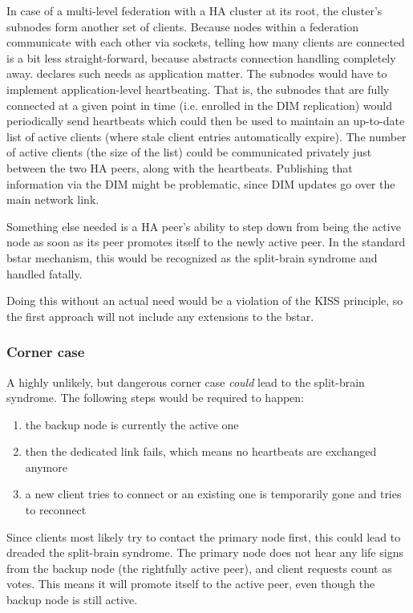 In case of a multi-level federation with a HA cluster at its root, the
cluster's subnodes form another set of clients. Because nodes within a
federation communicate with each other via \zmq sockets, telling how many
clients are connected is a bit less straight-forward, because \zmq abstracts
connection handling completely away. \zmq declares such needs as application matter.
The subnodes would have to implement application-level heartbeating.
That is, the subnodes that are fully connected at a given point in time (i.e. enrolled
in the DIM replication) would periodically send heartbeats which could then be
used to maintain an up-to-date list of active clients (where stale client
entries automatically expire).  The number of active clients (the size of the
list) could be communicated privately just between the two HA peers, along with
the heartbeats. Publishing that information via the DIM might be problematic,
since DIM updates go over the main network link.

Something else needed is a HA peer's ability to step down from being the
active node as soon as its peer promotes itself to the newly active peer. In
the standard \gls{bstar} mechanism, this would be recognized as the split-brain
syndrome and handled fatally.

Doing this without an actual need would be a violation of the KISS principle,
so the first approach will not include any extensions to the \gls{bstar}.

\subsubsection{Corner case}
A highly unlikely, but dangerous corner case \emph{could} lead to the
split-brain syndrome. The following steps would be required to happen:

\begin{enumerate}
	\item the backup node is currently the active one

	\item then the dedicated link fails, which means no heartbeats are
		exchanged anymore

	\item a new client tries to connect or an existing one is temporarily
		gone and tries to reconnect
\end{enumerate}

Since clients most likely try to contact the primary node first, this could
lead to dreaded the split-brain syndrome. The primary node does not hear any
life signs from the backup node (the rightfully active peer), and client
requests count as votes. This means it will promote itself to the active peer,
even though the backup node is still active.

